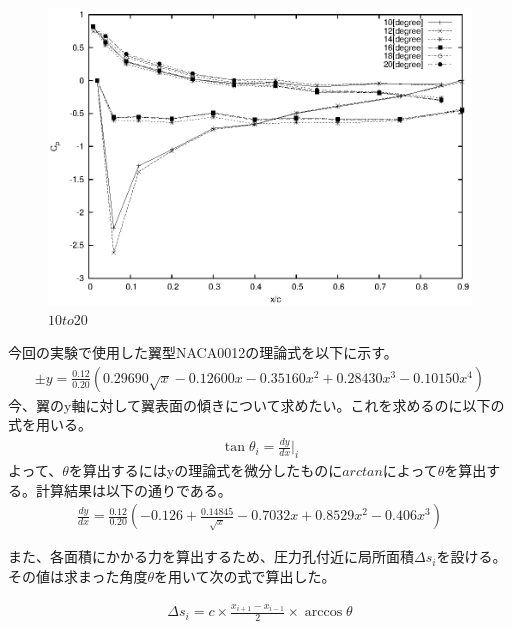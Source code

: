 \documentclass[a4j,twoside,openright,11pt]{jarticle}
\begin{document}
\begin{figure}[htbp]
\begin{center}
\includegraphics[width=12cm]{./2-CP/10-20.eps}
\end{center}
\caption{$10to20$}
\end{figure}

今回の実験で使用した翼型NACA0012の理論式を以下に示す。
\begin{eqnarray}
\pm y = \frac{0.12}{0.20}\left(0.29690\sqrt{x} -0.12600x -0.35160x^2 +0.28430x^3 -0.10150x^4 \right)
\end{eqnarray}
今、翼のy軸に対して翼表面の傾きについて求めたい。これを求めるのに以下の式を用いる。
\begin{eqnarray}
\tan \theta_i= \frac{dy}{dx}|_i
\end{eqnarray}
よって、$\theta$を算出するにはyの理論式を微分したものに$arctan$によって$\theta$を算出する。計算結果は以下の通りである。
\begin{eqnarray}
\frac{dy}{dx} = \frac{0.12}{0.20}(-0.126+\frac{0.14845}{\sqrt x}-0.7032x+0.8529x^2-0.406x^3)
\end{eqnarray}

また、各面積にかかる力を算出するため、圧力孔付近に局所面積$\Delta s_i$を設ける。その値は求まった角度$\theta$を用いて次の式で算出した。

\begin{eqnarray}
\Delta s_i = c \times \frac{x_{i+1} - x_{i-1}}{2} \times \arccos \theta
\end{eqnarray}
\end{document}
